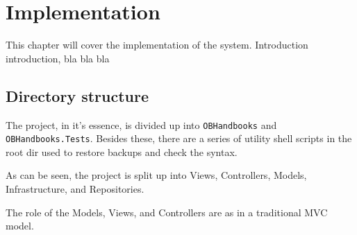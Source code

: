 \chapter{Implementation}
This chapter will cover the implementation of the system. Introduction introduction, bla bla bla
\section{Directory structure}
The project, in it's essence, is divided up into \texttt{OBHandbooks} and \texttt{OBHandbooks.Tests}. Besides these, there are a series of utility shell scripts in the root dir used to restore backups and check the syntax.

As can be seen, the project is split up into Views, Controllers, Models, Infrastructure, and Repositories.

The role of the Models, Views, and Controllers are as in a traditional MVC model.



